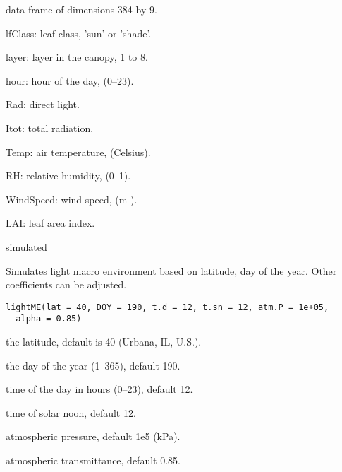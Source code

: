 \documentclass[letterpaper]{book}
\begin{document}
%
\begin{Format}
data frame of dimensions 384 by 9.
\end{Format}
%
\begin{Details}\relax
lfClass: leaf class, 'sun' or 'shade'.

layer: layer in the canopy, 1 to 8.

hour: hour of the day, (0--23).

Rad: direct light.

Itot: total radiation.

Temp: air temperature, (Celsius).

RH: relative humidity, (0--1).

WindSpeed: wind speed, (m ).

LAI: leaf area index.
\end{Details}
%
\begin{Source}\relax
simulated
\end{Source}
%
\begin{Description}\relax
Simulates light macro environment based on latitude, day of
the year. Other coefficients can be adjusted.
\end{Description}
%
\begin{Usage}
\begin{verbatim}
lightME(lat = 40, DOY = 190, t.d = 12, t.sn = 12, atm.P = 1e+05,
  alpha = 0.85)
\end{verbatim}
\end{Usage}
%
\begin{Arguments}
\begin{ldescription}
\item[\code{lat}] the latitude, default is 40 (Urbana, IL,
U.S.).

\item[\code{DOY}] the day of the year (1--365), default 190.

\item[\code{t.d}] time of the day in hours (0--23), default 12.

\item[\code{t.sn}] time of solar noon, default 12.

\item[\code{atm.P}] atmospheric pressure, default 1e5 (kPa).

\item[\code{alpha}] atmospheric transmittance, default 0.85.
\end{ldescription}
\end{Arguments}
\end{document}

